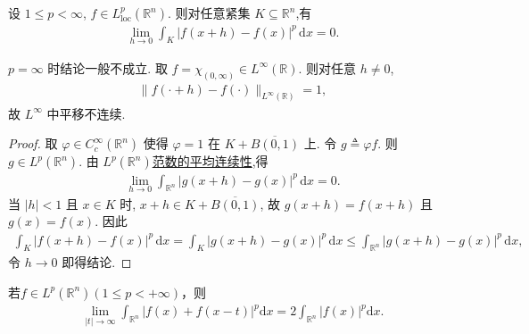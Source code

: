 \documentclass[../../main.tex]{subfiles}%
\begin{document}
\begin{theorem}[局部\(L^p\)范数的平均连续性]\label{theorem:Lp局部平均连续性-8v2q}
设 \(1\leqslant p<\infty\), \(f\in L^p_{\mathrm{loc}}(\mathbb{R}^n)\). 则对任意紧集 \(K\subseteq\mathbb{R}^n\),有
\begin{align*}
\lim\limits_{h\to 0}\int_K|f(x+h)-f(x)|^p\,\mathrm{d}x=0.
\end{align*}
\end{theorem}
\begin{remark}
\(p=\infty\) 时结论一般不成立. 取 \(f=\chi_{(0,\infty)}\in L^\infty(\mathbb{R})\). 则对任意 \(h\neq 0\),
\begin{align*}
\|f(\cdot+h)-f(\cdot)\|_{L^\infty(\mathbb{R})}=1,
\end{align*}
故 \(L^\infty\) 中平移不连续.
\end{remark}
\begin{proof}
取 \(\varphi\in C_c^\infty(\mathbb{R}^n)\) 使得 \(\varphi=1\) 在 \(K+\overline{B(0,1)}\) 上. 令 \(g\triangleq\varphi f\). 则 \(g\in L^p(\mathbb{R}^n)\). 由 \hyperref[theorem:Lp范数下平均连续性]{\(L^p(\mathbb{R}^n)\)范数的平均连续性},得
\begin{align*}
\lim\limits_{h\to 0}\int_{\mathbb{R}^n}|g(x+h)-g(x)|^p\,\mathrm{d}x=0.
\end{align*}
当 \(|h|<1\) 且 \(x\in K\) 时, \(x+h\in K+\overline{B(0,1)}\), 故 \(g(x+h)=f(x+h)\) 且 \(g(x)=f(x)\). 因此
\begin{align*}
\int_K|f(x+h)-f(x)|^p\,\mathrm{d}x
=\int_K|g(x+h)-g(x)|^p\,\mathrm{d}x
\leqslant\int_{\mathbb{R}^n}|g(x+h)-g(x)|^p\,\mathrm{d}x,
\end{align*}
令 \(h\to 0\) 即得结论.
\end{proof}

\begin{example}
若$f\in L^p(\mathbb{R}^n)(1\leqslant p<+\infty)$，则
\begin{align*}
\lim\limits_{|t|\to\infty}\int_{\mathbb{R}^n}|f(x)+f(x-t)|^p\mathrm{d}x=2\int_{\mathbb{R}^n}|f(x)|^p\mathrm{d}x.
\end{align*}
\end{example}
\end{document}
